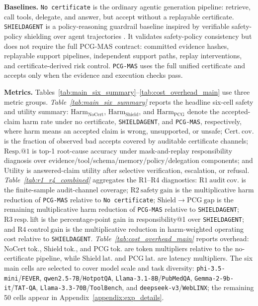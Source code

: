 \smallskip
\noindent\textbf{Baselines.}
\texttt{No certificate} is the ordinary agentic generation pipeline: retrieve, call tools, delegate,
and answer, but accept without a replayable certificate. \texttt{SHIELDAGENT} is a policy-reasoning
guardrail baseline inspired by verifiable safety-policy shielding over agent trajectories
\citep{shieldagent2025}. It validates safety-policy consistency but does not require the full
PCG-MAS contract: committed evidence hashes, replayable support pipelines, independent support
paths, replay interventions, and certificate-derived risk control. \texttt{PCG-MAS} uses the full
unified certificate and accepts only when the evidence and execution checks pass.

\smallskip
\noindent\textbf{Metrics.}
Tables~\ref{tab:main_six_summary}--\ref{tab:cost_overhead_main} use three metric groups. 
\emph{Table~\ref{tab:main_six_summary}} reports the headline six-cell safety and utility summary:
\(\mathrm{Harm}_{\mathrm{NoCert}}\), \(\mathrm{Harm}_{\mathrm{Shield}}\), and
\(\mathrm{Harm}_{\mathrm{PCG}}\) denote the accepted-claim harm rate under no certificate,
\texttt{SHIELDAGENT}, and \texttt{PCG-MAS}, respectively, where harm means an accepted claim is
wrong, unsupported, or unsafe; \(\mathrm{Cert.\ cov.}\) is the fraction of observed bad accepts
covered by auditable certificate channels; \(\mathrm{Resp.@1}\) is top-1 root-cause accuracy under
mask-and-replay responsibility diagnosis over evidence/tool/schema/memory/policy/delegation
components; and \(\mathrm{Utility}\) is answered-claim utility after selective verification,
escalation, or refusal. \emph{Table~\ref{tab:r1_r4_combined}} aggregates the R1--R4 diagnostics:
\(\mathrm{R1\ audit\ cov.}\) is the finite-sample audit-channel coverage; \(\mathrm{R2\ safety\
gain}\) is the multiplicative harm reduction of \texttt{PCG-MAS} relative to \texttt{No certificate};
\(\mathrm{Shield}\!\rightarrow\!\mathrm{PCG\ gap}\) is the remaining multiplicative harm reduction of
\texttt{PCG-MAS} relative to \texttt{SHIELDAGENT}; \(\mathrm{R3\ resp.\ lift}\) is the percentage-point
gain in responsibility@1 over \texttt{SHIELDAGENT}; and \(\mathrm{R4\ control\ gain}\) is the
multiplicative reduction in harm-weighted operating cost relative to \texttt{SHIELDAGENT}.
\emph{Table~\ref{tab:cost_overhead_main}} reports overhead: \(\mathrm{NoCert\ tok.}\),
\(\mathrm{Shield\ tok.}\), and \(\mathrm{PCG\ tok.}\) are token multipliers relative to the
no-certificate pipeline, while \(\mathrm{Shield\ lat.}\) and \(\mathrm{PCG\ lat.}\) are latency
multipliers. The six main cells are selected to cover model scale and task diversity:
\texttt{phi-3.5-mini}/\texttt{FEVER}, \texttt{qwen2.5-7B}/\texttt{HotpotQA},
\texttt{Llama-3.1-8B}/\texttt{PubMedQA}, \texttt{Gemma-2-9b-it}/\texttt{TAT-QA},
\texttt{Llama-3.3-70B}/\texttt{ToolBench}, and \texttt{deepseek-v3}/\texttt{WebLINX}; the remaining
50 cells appear in Appendix~\ref{appendix:exp_details}.

